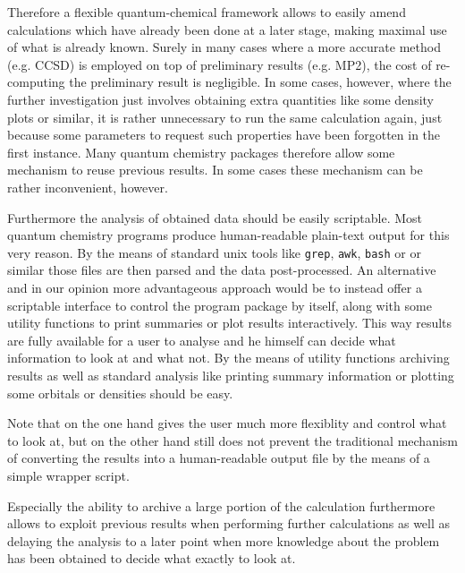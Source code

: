 Therefore a flexible quantum-chemical framework allows to
easily amend calculations which have already been done
at a later stage, making maximal use of what is already known.
Surely in many cases where a more accurate method (e.g. CCSD) is employed
on top of preliminary results (e.g. MP2),
the cost of re-computing the preliminary result is negligible.
In some cases, however,
where the further investigation just involves obtaining
extra quantities like some density plots or similar,
it is rather unnecessary to run the same calculation again,
just because some parameters to request such properties
have been forgotten in the first instance.
Many quantum chemistry packages therefore allow
some mechanism to reuse previous results.
In some cases these mechanism can be rather inconvenient, however.

Furthermore the analysis of obtained data should be easily scriptable.
Most quantum chemistry programs produce human-readable plain-text output
for this very reason.
By the means of standard unix tools like \texttt{grep}, \texttt{awk},
\texttt{bash} or \python or similar those files are then parsed and
the data post-processed.
An alternative and in our opinion more advantageous approach
would be to instead offer a scriptable interface to control
the program package by itself,
along with some utility functions to print summaries
or plot results interactively.
This way results are fully available for a user to analyse
and he himself can decide what information to look at
and what not.
By the means of utility functions
archiving results as well as standard analysis
like printing summary information or plotting some orbitals or densities
should be easy.

Note that on the one hand gives the user much more flexiblity and control
what to look at,
but on the other hand still does not prevent the traditional
mechanism of converting the results into a human-readable output file
by the means of a simple wrapper script.

Especially the ability to archive a large portion of the calculation
furthermore allows to exploit previous results when performing
further calculations as well as delaying the analysis
to a later point when \eg more knowledge about the
problem has been obtained to decide what exactly to look at.


